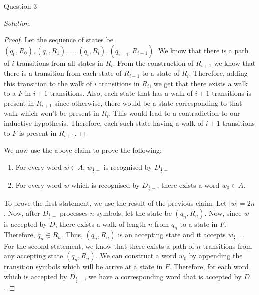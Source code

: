 \begin{solution}{Question 3}
\begin{proof}[Solution]
\begin{proof}
        Let the sequence of states be $(q_0, R_0), (q_1, R_1), \ldots, (q_i, R_i), (q_{i+1}, R_{i+1})$. We know that there is a path of $i$ transitions from all states in $R_i$. From the construction of $R_{i+1}$ we know that there is a transition from each state of $R_{i+1}$ to a state of $R_i$. Therefore, adding this transition to the walk of $i$ transitions in $R_i$, we get that there exists a walk to a $F$ in $i+1$ transitions. Also, each state that has a walk of $i+1$ transitions is present in $R_{i+1}$ since otherwise, there would be a state corresponding to that walk which won't be present in $R_i$. This would lead to a contradiction to our inductive hypothesis. Therefore, each such state having a walk of $i+1$ transitions to $F$ is present in $R_{i+1}$.
      \end{proof}
      We now use the above claim to prove the following:
      \begin{enumerate}
        \item For every word $w\in A$, $w_{\frac{1}{2}-}$ is recognised by $D_{\frac{1}{2}-}$
        \item For every word $w$ which is recognised by $D_{\frac{1}{2}-}$, there exists a word $w_0\in A$.
      \end{enumerate}
      To prove the first statement, we use the result of the previous claim. Let $|w| = 2n$. Now, after $D_{\frac{1}{2}-}$ processes $n$ symbols, let the state be $(q_n, R_n)$. Now, since $w$ is accepted by $D$, there exists a walk of length $n$ from $q_n$ to a state in $F$. Therefore, $q_n\in R_n$. Thus, $(q_n, R_n)$ is an accepting state and it accepts $w_{\frac{1}{2}-}$.\\
      For the second statement, we know that there exists a path of $n$ transitions from any accepting state $(q_n, R_n)$. We can construct a word $w_0$ by appending the transition symbols which will be arrive at a state in $F$. Therefore, for each word which is accepted by $D_{\frac{1}{2}-}$, we have a corresponding word that is accepted by $D$.
    \end{proof}
\end{solution}
